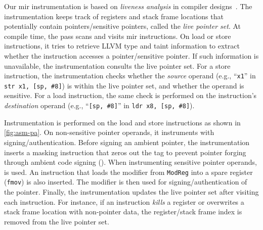 



% 
{} %
Our \gls{mir} instrumentation is based on \emph{liveness analysis} in compiler designs~\cite{reg-alloc}.
The instrumentation keeps track of registers and stack frame locations that potentially contain pointers/sensitive pointers, called the \emph{live pointer set}.
At compile time, the pass scans and visits \gls{mir} instructions.
On load or store instructions, it tries to retrieve LLVM type and taint information to extract whether the instruction accesses a pointer/sensitive pointer.
If such information is unavailable, the instrumentation consults the live pointer set.
For a store instruction, the instrumentation checks whether the \emph{source} operand (e.g., ``\texttt{x1}'' in \verb|str x1, [sp, #8]|) is within the live pointer set, and whether the operand is sensitive.
For a load instruction, the same check is performed on the instruction's \emph{destination} operand (e.g., ``\verb|[sp, #8]|'' in \verb|ldr x8, [sp, #8]|).

Instrumentation is performed on the load and store instructions as shown in \autoref{fig:asm-pa}. 
On non-sensitive pointer operands, it instruments with  signing/authentication. 
Before signing an ambient pointer, the instrumentation inserts a masking instruction that zeros out the tag to prevent pointer forging through ambient code signing (\srforge).
When instrumenting sensitive pointer operands,  is used. 
An instruction that loads the modifier from \texttt{ModReg} into a spare register (\texttt{fmov}) is also inserted. 
The modifier is then used for signing/authentication of the pointer.
Finally, the instrumentation updates the live pointer set after visiting each instruction.
For instance, if an instruction \emph{kills} a register or overwrites a stack frame location with non-pointer data, the register/stack frame index is removed from the live pointer set.





% 


